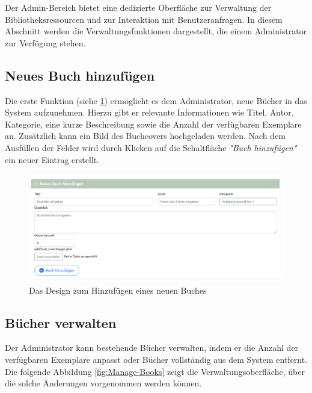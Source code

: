 Der Admin-Bereich bietet eine dedizierte Oberfläche zur Verwaltung der Bibliotheksressourcen und zur Interaktion mit Benutzeranfragen. In diesem Abschnitt werden die Verwaltungsfunktionen dargestellt, die einem Administrator zur Verfügung stehen.

\subsection{Neues Buch hinzufügen}
\noindent Die erste Funktion (siehe \ref{fig:Add-New-Book}) ermöglicht es dem Administrator, neue Bücher in das System aufzunehmen. Hierzu gibt er relevante Informationen wie Titel, Autor, Kategorie, eine kurze Beschreibung sowie die Anzahl der verfügbaren Exemplare an. Zusätzlich kann ein Bild des Buchcovers hochgeladen werden. Nach dem Ausfüllen der Felder wird durch Klicken auf die Schaltfläche \textit{"Buch hinzufügen"} ein neuer Eintrag erstellt.
\begin{figure}[H]
	\centering
	\includegraphics[width=1.0\textwidth]{images/UI-screenshots/Add-New-Book.png}
	\caption{Das Design zum Hinzufügen eines neuen Buches}
	\label{fig:Add-New-Book}
\end{figure}

\subsection{Bücher verwalten}

\noindent Der Administrator kann bestehende Bücher verwalten, indem er die Anzahl der verfügbaren Exemplare anpasst oder Bücher vollständig aus dem System entfernt. Die folgende Abbildung \ref{fig:Manage-Books} zeigt die Verwaltungsoberfläche, über die solche Änderungen vorgenommen werden können.

